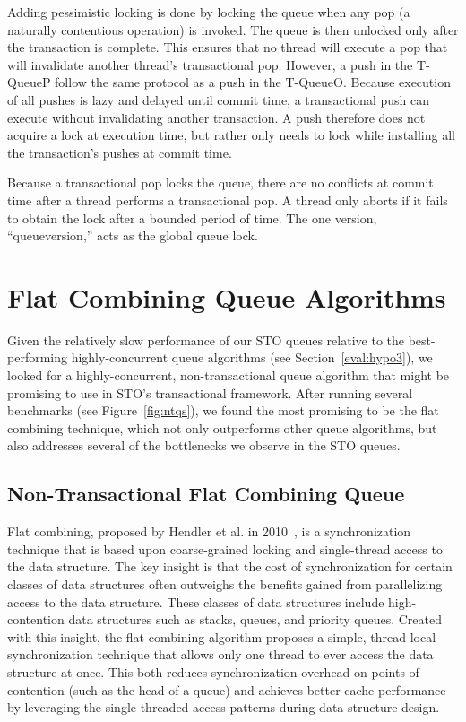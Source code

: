 Adding pessimistic locking is done by locking the queue when any pop (a naturally contentious operation) is invoked. The queue is then unlocked only after the transaction is complete. This ensures that no thread will execute a pop that will invalidate another thread's transactional pop. However, a push in the T-QueueP follow the same protocol as a push in the T-QueueO. Because execution of all pushes is lazy and delayed until commit time, a transactional push can execute without invalidating another transaction. A push therefore does not acquire a lock at execution time, but rather only needs to lock while installing all the transaction's pushes at commit time. 

Because a transactional pop locks the queue, there are no conflicts at commit time after a thread performs a transactional pop. A thread only aborts if it fails to obtain the lock after a bounded period of time. The one version, ``queueversion,'' acts as the global queue lock. 


\section{Flat Combining Queue Algorithms}
Given the relatively slow performance of our STO queues relative to the best-performing highly-concurrent queue algorithms (see Section~\ref{eval:hypo3}), we looked for a highly-concurrent, non-transactional queue algorithm that might be promising to use in STO's transactional framework. After running several benchmarks (see Figure~\ref{fig:ntqs}), we found the most promising to be the flat combining technique, which not only outperforms other queue algorithms, but also addresses several of the bottlenecks we observe in the STO queues.

\subsection{Non-Transactional Flat Combining Queue}
\label{fcqueuent}

Flat combining, proposed by Hendler et al. in 2010~\cite{flatcombining}, is a synchronization technique that is based upon coarse-grained locking and single-thread access to the data structure. The key insight is that the cost of synchronization for certain classes of data structures often outweighs the benefits gained from parallelizing access to the data structure. These classes of data structures include high-contention data structures such as stacks, queues, and priority queues. Created with this insight, the flat combining algorithm proposes a simple, thread-local synchronization technique that allows only one thread to ever access the data structure at once. This both reduces synchronization overhead on points of contention (such as the head of a queue) and achieves better cache performance by leveraging the single-threaded access patterns during data structure design.

